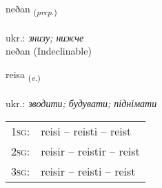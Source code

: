 \documentclass[frontgrid, backgrid]{flacards}\usepackage[]{graphicx}\usepackage[]{xcolor}
\begin{document}

\renewcommand{\flhead}{\vskip5pt \fboxsep=0pt {\small\bfseries\footnotesize Forsetning | прийменник}}
\renewcommand{\fcfoot}{\vskip5pt \fboxsep=0pt \hspace{2pt}{\small\bfseries\footnotesize 2K}}

\renewcommand{\blhead}{\vskip5pt {\small\bfseries\footnotesize Forsetning | прийменник }}
\renewcommand{\bcfoot}{\vskip5pt \hspace{2pt}{\small\bfseries\footnotesize 2K}}


{neðan \small{\textsubscript{(\textit{prep.})}} \\[1ex]
\textphonetic{[nɛːðan]} \\
ukr.: \emph{знизу; нижче} \\  [2ex]
neðan (Indeclinable)}

\renewcommand{\flhead}{\vskip5pt \fboxsep=0pt {\small\bfseries\footnotesize Sagnorð | дієслово}}
\renewcommand{\fcfoot}{\vskip5pt \fboxsep=0pt \hspace{2pt}{\small\bfseries\footnotesize 2K}}

\renewcommand{\blhead}{\vskip5pt {\small\bfseries\footnotesize Sagnorð | дієслово }}
\renewcommand{\bcfoot}{\vskip5pt \hspace{2pt}{\small\bfseries\footnotesize 2K}}


{reisa \small{\textsubscript{(\textit{v.})}} \\[1ex] %
\textphonetic{[reiːsa]} \\
ukr.: \emph{зводити; будувати; піднімати} \\  [2ex]
\renewcommand*{\arraystretch}{0.8}
\begin{tabular}{p{1cm}l}
\textsc{1sg}: & reisi -- reisti -- reist \\ 
\textsc{2sg}: & reisir -- reistir -- reist \\ 
\textsc{3sg}: & reisir -- reisti -- reist \\ 
\end{tabular}
}
\end{document}
